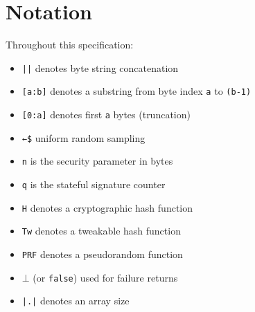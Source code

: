 \section{Notation}

Throughout this specification:

\begin{itemize}
    \item[] \texttt{||} \quad denotes byte string concatenation
    \item[] \texttt{[a:b]} \quad denotes a substring from byte index \texttt{a} to \texttt{(b-1)}
    \item[] \texttt{[0:a]} \quad denotes first \texttt{a} bytes (truncation)
    \item[] \texttt{←\$} \quad uniform random sampling
    \item[] \texttt{n} \quad is the security parameter in bytes
    \item[] \texttt{q} \quad is the stateful signature counter
    \item[] \texttt{H} \quad denotes a cryptographic hash function
    \item[] \texttt{Tw} \quad denotes a tweakable hash function
    \item[] \texttt{PRF} \quad denotes a pseudorandom function
    \item[] \texttt{$\bot$} \quad (or \texttt{false}) used for failure returns
    \item[] \texttt{|.|} \quad denotes an array size
\end{itemize}